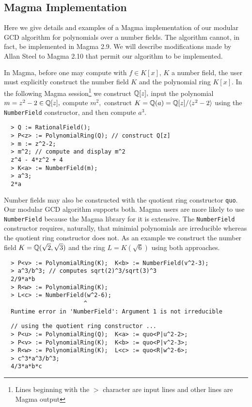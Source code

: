 \documentclass[10pt]{article}
\begin{document}
 

\subsection{Magma Implementation}



Here we give details and examples of a Magma implementation of our
modular GCD algorithm for polynomials over a number fields. The
algorithm cannot, in fact, be implemented in Magma 2.9. We will
describe modifications made by Allan Steel to Magma 2.10 that permit
our algorithm to be implemented.

In Magma, before one may compute with $f \in K[x]$, $K$ a number
field, the user must explicitly construct the number field $K$ and
the polynomial ring $K[x]$. In the following Magma
session\footnote{Lines beginning with the $>$ character are input
lines and other lines are Magma output} we construct ${\mathbb Q}[z],$ input
the polynomial $m = z^2-2 \in {\mathbb Q}[z],$ compute $m^2,$ construct $K =
{\mathbb Q}(a) = {\mathbb Q}[z]/\langle z^2-2 \rangle$ using the {\tt NumberField}
constructor, and then compute $a^3$.

{ \small
\begin{verbatim}
  > Q := RationalField();
  > P<z> := PolynomialRing(Q); // construct Q[z]
  > m := z^2-2;
  > m^2; // compute and display m^2
  z^4 - 4*z^2 + 4
  > K<a> := NumberField(m);
  > a^3;
  2*a
\end{verbatim}
}


\noindent Number fields may also be constructed with the quotient
ring constructor {\tt quo}. Our modular GCD algorithm supports both.
Magma users are more likely to use {\tt NumberField} because the
Magma library for it is extensive. The {\tt NumberField} constructor
requires, naturally, that minimial polynomials are irreducible
whereas the quotient ring constructor does not. As an example we
construct the number field $K = {\mathbb Q}(\sqrt 2, \sqrt 3)$ and the ring
$L = K(\sqrt 6)$ using both approaches.

{ \small
\begin{verbatim}
  > P<v> := PolynomialRing(K);  K<b> := NumberField(v^2-3);
  > a^3/b^3; // computes sqrt(2)^3/sqrt(3)^3
  2/9*a*b
  > R<w> := PolynomialRing(K);
  > L<c> := NumberField(w^2-6);
                       ^
  Runtime error in 'NumberField': Argument 1 is not irreducible
\end{verbatim}
\begin{verbatim}
  // using the quotient ring constructor ...
  > P<u> := PolynomialRing(Q);  K<a> := quo<P|u^2-2>;
  > P<v> := PolynomialRing(K);  K<b> := quo<P|v^2-3>;
  > R<w> := PolynomialRing(K);  L<c> := quo<R|w^2-6>;
  > c^3*a^3/b^3;
  4/3*a*b*c
\end{verbatim}
}
\end{document}
